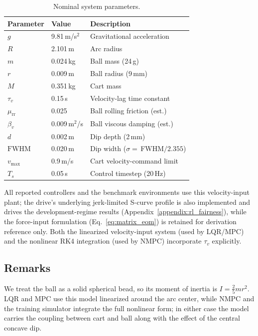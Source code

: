 \begin{table}[!tb]
\centering
\small
\setlength{\tabcolsep}{4pt}
\caption{Nominal system parameters.}
\label{tab:sys_params}
\begin{tabular}{llp{2.9cm}}
\toprule
\textbf{Parameter} & \textbf{Value} & \textbf{Description} \\
\midrule
$g$                & 9.81\,m/s$^2$  & Gravitational acceleration \\
$R$                & 2.101\,m        & Arc radius \\
$m$              & 0.024\,kg       & Ball mass (24\,g) \\
$r$              & 0.009\,m        & Ball radius (9\,mm) \\
$M$              & 0.351\,kg       & Cart mass \\
$\tau_v$           & 0.15\,s         & Velocity-lag time constant \\
$\mu_\mathrm{rr}$  & 0.025           & Ball rolling friction (est.) \\
$\beta_v$          & 0.009\,m$^2$/s  & Ball viscous damping (est.) \\
$d$                & 0.002\,m        & Dip depth (2\,mm) \\
$\mathrm{FWHM}$    & 0.020\,m        & Dip width ($\sigma=$\,FWHM$/2.355$) \\
$v_\mathrm{max}$   & 0.9\,m/s        & Cart velocity-command limit \\
$T_s$              & 0.05\,s         & Control timestep (20\,Hz) \\
\bottomrule
\end{tabular}
\end{table}

All reported controllers and the benchmark environments use this
velocity-input plant; the drive's underlying jerk-limited S-curve
profile is also implemented and drives the development-regime results
(Appendix~\ref{appendix:rl_fairness}), while the force-input formulation
(Eq.~\eqref{eq:matrix_eom}) is retained for derivation
reference only.  Both the linearized velocity-input system
(used by LQR/MPC) and the nonlinear RK4 integration
(used by NMPC) incorporate $\tau_v$ explicitly.

\subsection{Remarks}
We treat the ball as a solid spherical bead, so its moment of inertia is
$I = \tfrac{2}{5} m r^2$. LQR and MPC use this model linearized around the arc
center, while NMPC and the training simulator integrate the full nonlinear
form; in either case the model carries the coupling between cart and ball
along with the effect of the central concave dip.


